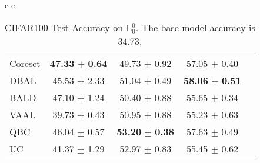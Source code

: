 \documentclass[10pt,twocolumn,letterpaper]{article}
\begin{document}
\begin{table}[ht]
\begin{center}
\begin{tabular}{c c}
\begin{minipage}{0.5\linewidth}
{\begin{tabular}{l|cccc}
        Coreset & \textbf{47.33} $\pm$ \textbf{0.64} & 49.73 $\pm$ 0.92 & 57.05 $\pm$ 0.40\\
        DBAL & 45.53 $\pm$ 2.33 & 51.04 $\pm$ 0.49 & \textbf{58.06} $\pm$ \textbf{0.51} \\
        BALD & 47.10 $\pm$ 1.24 & 50.40 $\pm$ 0.88 & 55.65 $\pm$ 0.34\\
        VAAL & 39.73 $\pm$ 0.43 & 50.95 $\pm$ 0.88 & 55.23 $\pm$ 0.63\\
        QBC & 46.04 $\pm$ 0.57 & \textbf{53.20} $\pm$ \textbf{0.38} & 57.63 $\pm$ 0.49\\
        UC & 41.37 $\pm$ 1.29 & 52.97 $\pm$ 0.83 & 55.45 $\pm$ 0.62 \\
        
        \bottomrule
        \end{tabular}}
        
        \caption{CIFAR100 Test Accuracy on L$_{0}^{0}$. The base model accuracy is $34.73$.}
        
        \label{tab:CIFAR100_tab12_supp}
        
    \end{minipage}
    
        
        \end{tabular}
        
    \end{center}
\end{table}
\end{document}
